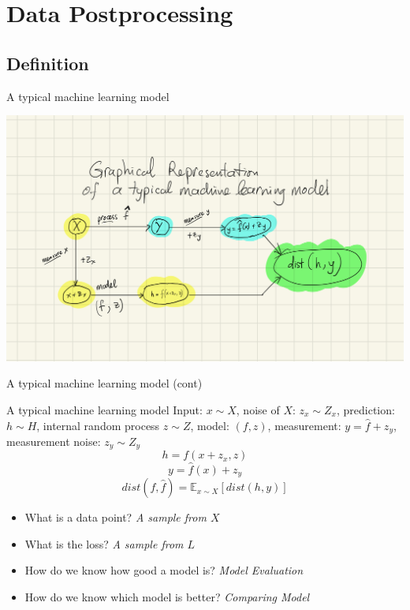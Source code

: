 \section{Data Postprocessing}

\subsection{Definition}


\begin{frame}{A typical machine learning model}
    \begin{center}
        \includegraphics[width=1.0\textwidth]{assets/model.jpeg}
    \end{center}
\end{frame}

\begin{frame}{A typical machine learning model (cont)}
\begin{exampleblock}{A typical machine learning model}
Input: $x \sim X$, noise of $X$: $z_x \sim Z_x$, prediction: $h \sim H$, internal random process $z \sim Z$, model: $(f, z)$, measurement: $y = \hat{f} + z_y$, measurement noise: $z_y \sim Z_y$
\[
    h = f(x + z_x, z)
\]
\[
    y = \hat{f}(x) + z_y
\]
\[
    dist(f, \hat{f}) = \mathbb{E}_{x \sim X}[dist(h, y)]
\]

\end{exampleblock}

\begin{itemize}
    \item What is a data point? 
    \emph{A sample from $X$}
    \item What is the loss? 
    \emph{A sample from $L$}
    \item How do we know how good a model is? 
    \emph{Model Evaluation}
    \item How do we know which model is better? 
    \emph{Comparing Model}
    
\end{itemize}

\end{frame}

